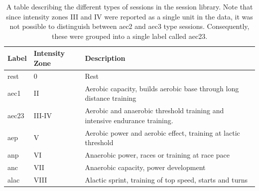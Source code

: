\begin{table}
\centering
\begin{tabularx}{0.9\textwidth}{llL}
\toprule
Label  & Intensity Zone & Description                                                             \\ \midrule
rest   & 0              & Rest                                                                    \\
aec1   & II             & Aerobic capacity, builds aerobic base through long distance training    \\
aec23  & III-IV         & Aerobic and anaerobic threshold training and intensive endurance training. \\
aep    & V              & Aerobic power and aerobic effect, training at lactic threshold          \\
anp    & VI             & Anaerobic power, races or training at race pace                         \\
anc    & VII            & Anaerobic capacity, power development                                   \\
alac   & VIII           & Alactic sprint, training of top speed, starts and turns                \\ \bottomrule
\end{tabularx}
\caption{A table describing the different types of sessions in the session library. Note that since intensity zones III and IV were reported as a single unit in the data, it was not possible to distinguish between aec2 and aec3 type sessions. Consequently, these were grouped into a single label called aec23.}
\label{tab:session_labels}
\end{table}


